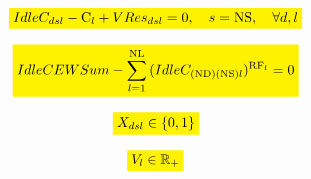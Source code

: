 \documentclass{singlecol}
\newcommand{\mathcolorbox}[2]{\colorbox{#1}{$\displaystyle #2$}}
\theoremstyle{TH}{
\newtheorem{lemma}{Lemma}
\newtheorem{theorem}[lemma]{Theorem}
\newtheorem{corrolary}[lemma]{Corrolary}
\newtheorem{conjecture}[lemma]{Conjecture}
\newtheorem{proposition}[lemma]{Proposition}
\newtheorem{claim}[lemma]{Claim}
\newtheorem{stheorem}[lemma]{Wrong Theorem}
\newtheorem{algorithm}{Algorithm}
}
\theoremstyle{THrm}{
\newtheorem{definition}{Definition}[section]
\newtheorem{question}{Question}[section]
\newtheorem{remark}{Remark}
\newtheorem{scheme}{Scheme}
}
\theoremstyle{THhit}{
\newtheorem{case}{Case}[section]
}
\begin{document}
\begin{equation}
	\mathcolorbox{yellow}{IdleC_{dsl} - \mathrm{C}_{l} + VRes_{dsl} = 0, \quad s = \mathrm{NS}, \quad \forall{d, l}}
	\label{eq:evalIdleCap}
\end{equation}

\begin{equation}
	\mathcolorbox{yellow}{IdleCEWSum - \sum_{l=1}^{\mathrm{NL}}{ (IdleC_{({\mathrm{ND}})({\mathrm{NS}})l})^{\mathrm{RF}_l }    } = 0}
	\label{eq:idleCapEWSum}
\end{equation}

\begin{equation}
	\mathcolorbox{yellow}{X_{dsl} \in \{0, 1\}}
	\label{eq:bv}
\end{equation}

\begin{equation}
	\mathcolorbox{yellow}{V_{l} \in \mathbb{R}_+}
	\label{eq:rv}
\end{equation}
\end{document}
